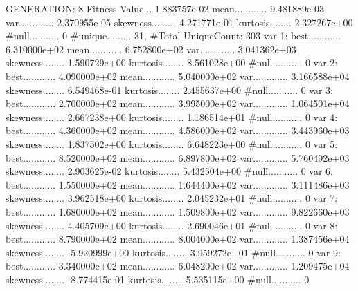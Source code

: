 \documentclass[oneside,letterpaper,titlepage]{article}
\begin{document}
\begin{Schunk}
\begin{Soutput}
GENERATION: 8
Fitness Value... 1.883757e-02
mean............ 9.481889e-03
var............. 2.370955e-05
skewness........ -4.271771e-01
kurtosis........ 2.327267e+00
#null........... 0
#unique......... 31, #Total UniqueCount: 303
var 1:
best............ 6.310000e+02
mean............ 6.752800e+02
var............. 3.041362e+03
skewness........ 1.590729e+00
kurtosis........ 8.561028e+00
#null........... 0
var 2:
best............ 4.090000e+02
mean............ 5.040000e+02
var............. 3.166588e+04
skewness........ 6.549468e-01
kurtosis........ 2.455637e+00
#null........... 0
var 3:
best............ 2.700000e+02
mean............ 3.995000e+02
var............. 1.064501e+04
skewness........ 2.667238e+00
kurtosis........ 1.186514e+01
#null........... 0
var 4:
best............ 4.360000e+02
mean............ 4.586000e+02
var............. 3.443960e+03
skewness........ 1.837502e+00
kurtosis........ 6.648223e+00
#null........... 0
var 5:
best............ 8.520000e+02
mean............ 6.897800e+02
var............. 5.760492e+03
skewness........ 2.903625e-02
kurtosis........ 5.432504e+00
#null........... 0
var 6:
best............ 1.550000e+02
mean............ 1.644400e+02
var............. 3.111486e+03
skewness........ 3.962518e+00
kurtosis........ 2.045232e+01
#null........... 0
var 7:
best............ 1.680000e+02
mean............ 1.509800e+02
var............. 9.822660e+03
skewness........ 4.405709e+00
kurtosis........ 2.690046e+01
#null........... 0
var 8:
best............ 8.790000e+02
mean............ 8.004000e+02
var............. 1.387456e+04
skewness........ -5.920999e+00
kurtosis........ 3.959272e+01
#null........... 0
var 9:
best............ 3.340000e+02
mean............ 6.048200e+02
var............. 1.209475e+04
skewness........ -8.774415e-01
kurtosis........ 5.535115e+00
#null........... 0


\end{Soutput}
\end{Schunk}
\end{document}
